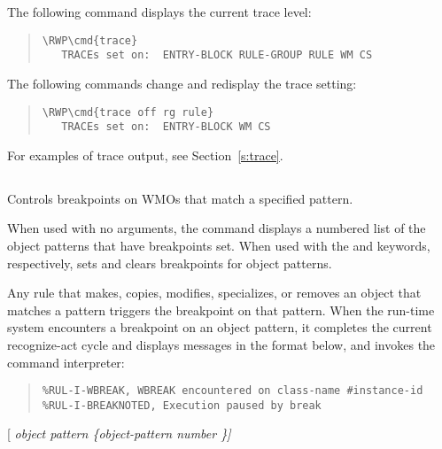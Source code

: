 {{\Example

The following command displays the current trace level:

\begin{quote}
\begin{Verbatim}[commandchars=\\\{\}]
\RWP\cmd{trace}
   TRACEs set on:  ENTRY-BLOCK RULE-GROUP RULE WM CS
\end{Verbatim}
\end{quote}

The following commands change and redisplay the trace
setting:

\begin{quote}
\begin{Verbatim}[commandchars=\\\{\}]
\RWP\cmd{trace off rg rule}
   TRACEs set on:  ENTRY-BLOCK WM CS
\end{Verbatim}
\end{quote}  

For examples of trace output, see Section~\ref{s:trace}.

\subsection{}

Controls breakpoints on WMOs that match a specified pattern.

When used with no arguments, the command displays a numbered list of
the object patterns that have breakpoints set. When used with the
 and  keywords, respectively,  sets and
clears breakpoints for object patterns.

Any rule that makes, copies, modifies, specializes, or removes an
object that matches a pattern triggers the breakpoint on that
pattern. When the run-time system encounters a breakpoint on an object
pattern, it completes the current recognize-act cycle and displays
messages in the format below, and invokes the command interpreter:

\begin{quote}
\begin{verbatim}
%RUL-I-WBREAK, WBREAK encountered on class-name #instance-id
%RUL-I-BREAKNOTED, Execution paused by break
\end{verbatim}
\end{quote}

\Format

 [ \it{object pattern}  \{\it{object-pattern}
\it{number} \co*\}]

}}
